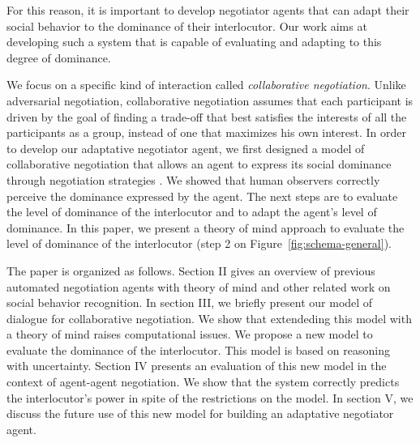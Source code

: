\documentclass[sigconf]{aamas}  %
\begin{document}
	For this reason, it is important to develop negotiator agents that can adapt their social behavior to the dominance of their interlocutor. Our work aims at developing such a system that is capable of evaluating and adapting to this degree of dominance.
	
	We focus on a specific kind of interaction called \emph{collaborative negotiation}. Unlike adversarial negotiation, collaborative negotiation assumes that each participant is driven by the goal of finding a trade-off that best satisfies the interests of all the participants as a group, instead of one that maximizes his own interest\cite{sidnerartificial,chu1995response}. In order to develop our adaptative negotiator agent, we first designed a model of collaborative negotiation that allows an agent to express its social dominance through negotiation strategies \cite{ouali2017computational}. We showed that human observers correctly perceive the dominance expressed by the agent. The next steps are to evaluate the level of dominance of the interlocutor and to adapt the agent's level of dominance. In this paper, we present a theory of mind approach to evaluate the level of dominance of the interlocutor (step 2 on Figure~\ref{fig:schema-general}).
	
%	
%	
%	
%	
%	
%	
%	
	The paper is organized as follows. Section II gives an overview of previous automated negotiation agents with theory of mind and other related work on social behavior recognition. In section III, we briefly present our model of dialogue for collaborative negotiation. We show that extendeding this model with a theory of mind raises computational issues. We propose a new model to evaluate the dominance of the interlocutor. This model is based on reasoning with uncertainty. Section IV presents an evaluation of this new model in the context of agent-agent negotiation. We show that the system correctly predicts the interlocutor's power in spite of the restrictions on the model. In section V, we discuss the future use of this new model for building an adaptative negotiator agent.
	
\end{document}
